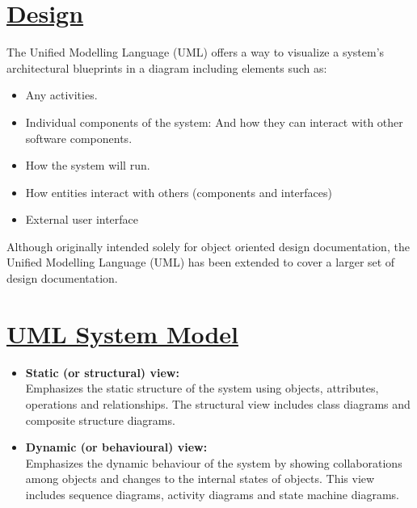 \documentclass[12pt]{extreport}
\begin{document}
\section*{\underline{Design}}
The Unified Modelling Language (UML) offers a way to visualize a system's architectural blueprints in a diagram  including elements such as:
\begin{itemize}


\item Any activities.
\item Individual components of the system:
And how they can interact with other software components.
\item How the system will run.
\item How entities interact with others (components and interfaces)
\item External user interface
\end{itemize}
\hspace*{5em}Although originally intended solely for object oriented design documentation, the Unified Modelling Language (UML) has been extended to cover a larger set of design documentation.


\section*{\underline{UML System Model}}
\begin{itemize}
\item \textbf{Static (or structural) view:}\\
Emphasizes the static structure of the system using objects, attributes,
operations and relationships. The structural view includes class diagrams and composite structure
diagrams.
\item \textbf{Dynamic (or behavioural) view:}\\
Emphasizes the dynamic behaviour of the system by showing collaborations among objects and changes to the internal states of objects. This view includes sequence diagrams, activity diagrams and state machine diagrams.
\end{itemize}
\end{document}
